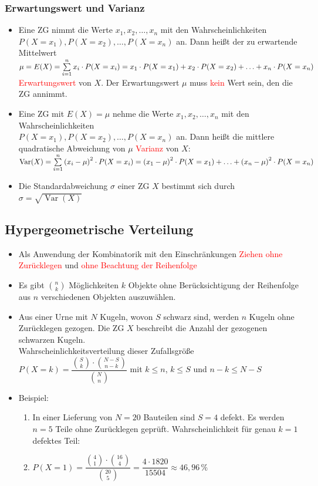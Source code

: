 \subsubsection{Erwartungswert und Varianz}
\begin{itemize}
    \item Eine ZG nimmt die Werte $x_1, x_2,\ldots , x_n$ mit den Wahrscheinlichkeiten $P(X=x_1), P(X=x_2), \ldots, P(X=x_n)$ an. Dann heißt der zu erwartende Mittelwert\\ $ \mu =E(X) = \sum\limits_{i=1}^n x_i\cdot P(X=x_i) \\= x_1\cdot P(X=x_1) + x_2\cdot P(X=x_2) +\ldots + x_n \cdot P(X=x_n)$ \textcolor{red}{Erwartungswert} von $X$. \mynote Der Erwartungswert $\mu$ muss \textcolor{red}{kein} Wert sein, den die ZG annimmt.
    \item Eine ZG mit $E(X) = \mu$ nehme die Werte $x_1, x_2,\ldots , x_n$ mit den Wahrscheinlichkeiten\\ $P(X=x_1), P(X=x_2), \ldots, P(X=x_n)$ an. Dann heißt die mittlere quadratische Abweichung von $\mu$ \textcolor{red}{Varianz} von $X$: \\ $\operatorname{Var}(X) = \sum\limits_{i=1}^n \left(x_i - \mu\right)^2 \cdot P(X = x_i)\\ = \left(x_1 - \mu\right)^2 \cdot P(X = x_1) + \ldots + \left(x_n - \mu\right)^2 \cdot P(X = x_n)$
    \item Die Standardabweichung $\sigma$ einer ZG $X$ bestimmt sich durch $\sigma = \sqrt{\operatorname{Var}(X)}$
\end{itemize}

\subsection{Hypergeometrische Verteilung}
\begin{itemize}
    \item Als Anwendung der Kombinatorik mit den Einschränkungen \textcolor{red}{Ziehen ohne Zurücklegen} und \textcolor{red}{ohne Beachtung der Reihenfolge}
    \item Es gibt $\binom{n}{k}$ Möglichkeiten $k$ Objekte ohne Berücksichtigung der Reihenfolge aus $n$ verschiedenen Objekten auszuwählen.
    \item Aus einer Urne mit $N$ Kugeln, wovon $S$ schwarz sind, werden $n$ Kugeln ohne Zurücklegen gezogen. Die ZG $X$ beschreibt die Anzahl der gezogenen schwarzen Kugeln.\\
Wahrscheinlichkeitsverteilung dieser Zufallsgröße \\$P(X = k) = \dfrac{\binom{S}{k}\cdot \binom{N-S}{n-k}}{\binom{N}{n}}$ mit $k\leq n$, $k\leq S$ und $n-k \leq N-S$
\item Beispiel: 
\begin{enumerate}
\item In einer Lieferung von $N=20$ Bauteilen sind $S=4$ defekt. Es werden $n=5$ Teile ohne Zurücklegen geprüft. Wahrscheinlichkeit für genau $k=1$ defektes Teil:\\
    \item $P(X=1)= \dfrac {\binom{4}{1} \cdot \binom {16}{4}}{\binom{20}{5}} = \dfrac{4\cdot 1820}{15504} \approx 46{,}96\,\%$
\end{enumerate}
\end{itemize}
